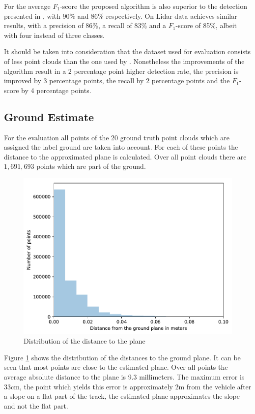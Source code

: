 For the average $F_1$-score the proposed algorithm is also superior to the detection presented in \cite{AttBen17}, with 90\% and 86\% respectively. On Lidar data \cite{AttBen17} achieves similar results, with a precision of 86\%, a recall of 83\% and a $F_1$-score of 85\%, albeit with four instead of three classes.

It should be taken into consideration that the dataset used for evaluation consists of less point clouds than the one used by \cite{AttBen17}.
Nonetheless the improvements of the algorithm result in a 2 percentage point higher detection rate, the precision is improved by 3 percentage points, the recall by 2 percentage points and the $F_1$-score by 4 percentage points.

\subsection{Ground Estimate}
For the evaluation all points of the 20 ground truth point clouds which are assigned the label ground are taken into account.
For each of these points the distance to the approximated plane is calculated.
Over all point clouds there are $1,691,693$ points which are part of the ground.

\begin{figure}[h!]
    \centering
    \includegraphics[width=\textwidth]{../Material/ground.pdf}
    \caption{Distribution of the distance to the plane}
    \label{fig:eval:groundDist}
\end{figure}

Figure \ref{fig:eval:groundDist} shows the distribution of the distances to the ground plane. 
It can be seen that most points are close to the estimated plane. Over all points the average absolute distance to the plane is 9.3 millimeters. The maximum error is 33cm, the point which yields this error is approximately $2\si{\m}$ from the vehicle after a slope on a flat part of the track, the estimated plane approximates the slope and not the flat part.

